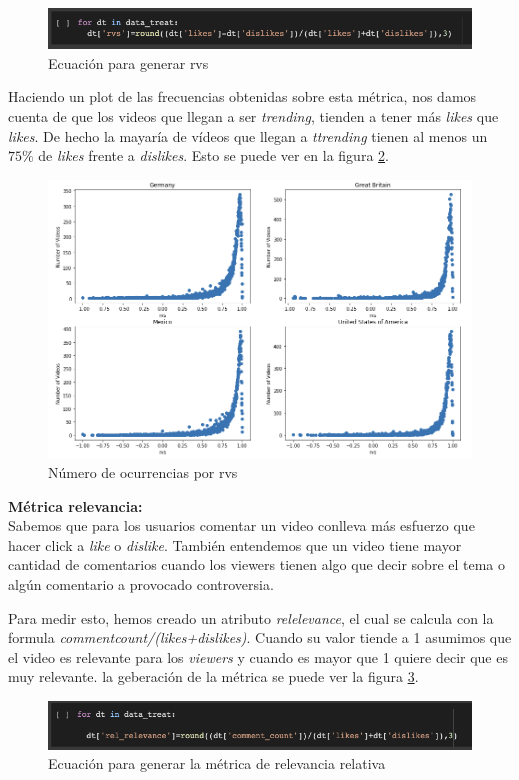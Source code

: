 \documentclass[a4paper,12pt]{article}
\begin{document}
\begin{figure}[h!]
\centering
\includegraphics[width=13cm]{rvs_gen.png}
\caption{Ecuaci\'on para generar rvs}
\label{fig:rvsform}
\end{figure}

Haciendo un plot de las frecuencias obtenidas sobre esta m\'etrica, nos damos cuenta de que los videos que llegan a ser {\itshape trending}, tienden a tener m\'as {\itshape likes} que {\itshape likes}. De hecho la mayar\'ia de v\'ideos que llegan a {\itshape ttrending} tienen al menos un $75\%$ de {\itshape likes} frente a {\itshape dislikes}. Esto se puede ver en la figura \ref{fig:rvsgraf}.

\begin{figure}[h!]
\centering
\includegraphics[width=14cm]{rvs_plot.png}
\caption{N\'umero de ocurrencias por rvs}
\label{fig:rvsgraf}
\end{figure}

\textbf{M\'etrica relevancia:}\\
Sabemos que para los usuarios comentar un video conlleva m\'as esfuerzo que hacer click a {\itshape like} o {\itshape dislike}. Tambi\'en entendemos que un video tiene mayor cantidad de comentarios cuando los viewers tienen algo que decir sobre el tema o alg\'un comentario a provocado controversia.

Para medir esto, hemos creado un atributo {\itshape rel{\textunderscore}elevance}, el cual se calcula con la formula {\itshape comment{\textunderscore}count/(likes+dislikes)}. Cuando su valor tiende a 1 asumimos que el video es relevante para los {\itshape viewers} y cuando es mayor que 1 quiere decir que es muy relevante. la geberaci\'on de la m\'etrica se puede ver la figura \ref{fig:relfor}.
\begin{figure}[h!]
\centering
\includegraphics[width=13cm]{rel_gen.png}
\caption{Ecuaci\'on para generar la m\'etrica de relevancia relativa}
\label{fig:relfor}

\end{figure}
\end{document}
